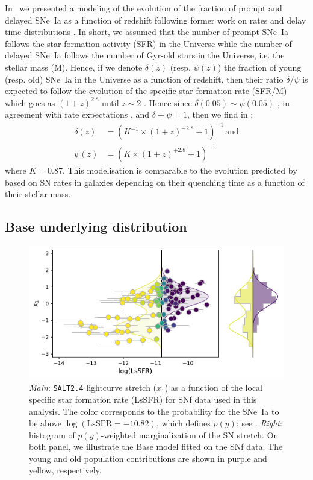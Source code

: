 \documentclass[]{aa} %
\newcommand{\nn}[1]{{\textcolor[rgb]{1, 0.27, 0}{#1}}}
\begin{document}
In~\cite{rigault2018} we presented a modeling of the evolution of the fraction
of prompt and delayed SNe~Ia as a function of redshift following former work on
rates and delay time distributions \citep[e.g.,][]{mannucci2005,
scannapieco2005, sullivan2006, aubourg2008, childress2014, maozmannucci2014}.
In short, we assumed that the number of prompt SNe~Ia follows the star formation
activity \nn{(SFR)} in the Universe while the number of delayed SNe~Ia follows
the number of Gyr-old stars in the Universe, i.e. the stellar mass \nn{(M)}.
Hence, if we denote $\delta(z)$ (resp. $\psi(z)$) the fraction of young (resp.
old) SNe~Ia in the Universe as a function of redshift, then their ratio
$\delta/\psi$ is expected to follow the evolution of the specific star formation
rate \nn{(SFR/M)} which goes as $(1+z)^{2.8}$ until $z\sim2$
\citep[e.g.,][]{tasca2015}. Hence since \nn{$\delta(0.05) \sim \psi(0.05)$}
\citep{rigault2013,rigault2018,wiseman2020}, in agreement with rate expectations
\citep{mannucci2006,rodney2014}, \nn{and $\delta + \psi = 1$,} then we find in
\cite{rigault2018}:
\begin{align}
    \label{eq:delta}
    \delta(z) & = \left( K^{-1} \times (1+z)^{-2.8} +1 \right)^{-1}\,
    \mathrm{and}\\
    \psi(z) & = \left( K \times (1+z)^{+2.8} +1 \right)^{-1}
\end{align}
where $K=0.87$. This modelisation is comparable to the evolution predicted by
\cite{childress2014} based on SN rates in galaxies depending on their quenching
time as a function of their stellar mass.

\subsection{\nn{Base underlying distribution}}
\label{sec:basemodel}

\begin{figure}
    \centering
    \includegraphics[width=0.8\linewidth]{Article_figures/model_base_hist.pdf}
    \caption{\textit{Main}: \textsc{\texttt{SALT2.4}} lightcurve stretch ($x_1$) as a function of
        the local specific star formation rate (LsSFR) for SNf data used in this
        analysis. The color corresponds to the probability for the SNe~Ia to be
        above $\log(\mathrm{LsSFR}=-10.82)$, which defines $p(y)$; see
        \cite{rigault2018}. \textit{Right}: histogram of $p(y)$-weighted
        marginalization of the SN stretch. On both panel, we illustrate the
        Base model fitted on the SNf data. The young and old population
        contributions are shown in purple and yellow, respectively.}
    \label{fig:stretchlssfr}
\end{figure}
\end{document}
